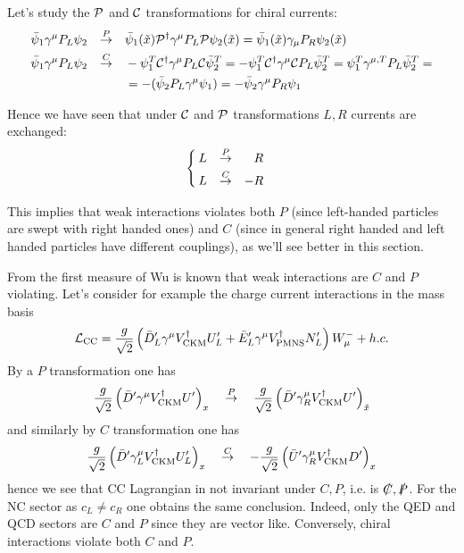 \documentclass[TheoreticalPhy_ModB.tex]{subfiles}
\begin{document}
\begin{exercise}

Let's study the $\mathcal P$ and $\mathcal C$ transformations for chiral currents:
\[\begin{aligned}
\bar\psi_1\gamma^\mu P_L\psi_2 &&\overset{P}{\to}\quad&\bar\psi_1(\tilde x)\mathcal P^\dagger\gamma^\mu P_L\mathcal P\psi_2(\tilde x)=\bar\psi_1(\tilde x)\gamma_\mu P_R\psi_2(\tilde x)\\
\bar\psi_1\gamma^\mu P_L\psi_2&&\overset{C}{\to}\quad&-\psi_1^T\mathcal C^\dagger\gamma^\mu P_L\mathcal C\bar\psi_2^T=-\psi_1^T\mathcal C^\dagger\gamma^\mu\mathcal C P_L\bar\psi_2^T = \psi_1^T\gamma^{\mu,T}P_L\bar\psi_2^T=\\
&&&=-(\bar\psi_2P_L\gamma^\mu\psi_1)=-\bar\psi_2\gamma^\mu P_R\psi_1
\end{aligned}\]

Hence we have seen that under $\mathcal C$ and $\mathcal P$ transformations $L,R$ currents are exchanged:
\[\begin{cases}\begin{aligned}
L&&\overset{P}{\to}&&R\\
L&&\overset{C}{\to}&&-R\\
\end{aligned}\end{cases}\]

This implies that weak interactions violates both $P$ (since left-handed particles are swept with right handed ones) and $C$ (since in general right handed and left handed particles have different couplings), as we'll see better in this section.

\end{exercise}

From the first measure of Wu is known that weak interactions are $C$ and $P$ violating. Let's consider for example the charge current interactions in the mass basis
\[\mathcal L_{\text{CC}}=\frac g{\sqrt2}\left(\bar D_L'\gamma^\mu V_{\text{CKM}}^\dagger U_L'+\bar E_L'\gamma^\mu V_{\text{PMNS}}^\dagger N_L'\right)W_\mu^-+h.c.\]
By a $P$ transformation one has
\[\frac g{\sqrt2}\left(\bar D'\gamma^\mu V_{\text{CKM}}^\dagger U'\right)_x\quad\overset{P}{\to}\quad \frac g{\sqrt2}\left(\bar D'\gamma^\mu_RV_{\text{CKM}}^\dagger U'\right)_{\tilde x}\]
and similarly by $C$ transformation one has 
\[\frac g{\sqrt2}\left(\bar D'\gamma_L^\mu V_{\text{CKM}}^\dagger U_L'\right)_x\quad\overset{C}{\to}\quad-\frac g{\sqrt2}\left(\bar U'\gamma^\mu_RV_{\text{CKM}}^\dagger D'\right)_x\]
hence we see that CC Lagrangian in not invariant under $C,P$, i.e. is $\slashed C,\slashed P$. For the NC sector as $c_L\neq c_R$ one obtains the same conclusion. 
Indeed, only the QED and QCD sectors are $C$ and $P$ since they are vector like. Conversely, chiral interactions violate both $C$ and $P$.
\end{document}

